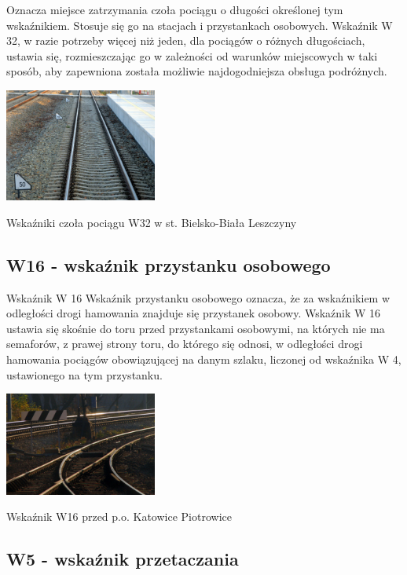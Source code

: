 Oznacza miejsce zatrzymania czoła pociągu o długości określonej tym wskaźnikiem. Stosuje się go na stacjach i przystankach osobowych. Wskaźnik W 32, w razie potrzeby więcej niż jeden, dla pociągów o różnych długościach, ustawia się, rozmieszczając go w zależności od warunków miejscowych w taki sposób, aby zapewniona została możliwie
najdogodniejsza obsługa podróżnych.
	\begin{marginfigure}
		\includegraphics[width=5cm]{skryptkierownik-img/skryptkierownik-img007.jpg}
		\caption{Wskaźniki czoła pociągu W32 w st. Bielsko-Biała Leszczyny}
	\end{marginfigure}

\subsection{W16 - wskaźnik przystanku osobowego}

Wskaźnik W 16 {\textquotedbl}Wskaźnik przystanku osobowego{\textquotedbl} oznacza, że za wskaźnikiem w odległości drogi hamowania znajduje się przystanek osobowy. Wskaźnik W 16 ustawia się skośnie do toru przed przystankami osobowymi, na których nie ma semaforów, z prawej strony toru, do którego się odnosi, w odległości drogi hamowania pociągów obowiązującej na danym szlaku, liczonej od wskaźnika W 4, ustawionego na tym przystanku.
	\begin{marginfigure}
		\includegraphics[width=5cm]{skryptkierownik-img/skryptkierownik-img008.jpg}
		\caption{Wskaźnik W16 przed p.o. Katowice Piotrowice}
	\end{marginfigure}

\subsection{W5 - wskaźnik przetaczania}

